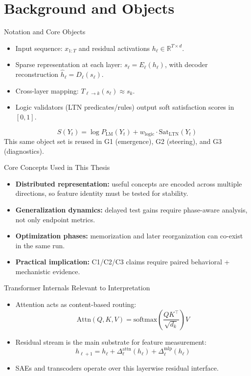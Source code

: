 \section{Background and Objects}

\begin{frame}{Notation and Core Objects}
    \small
    \begin{itemize}
        \item Input sequence: $x_{1:T}$ and residual activations $h_{\ell}\in\mathbb{R}^{T\times d}$.
        \item Sparse representation at each layer: $s_{\ell}=E_{\ell}(h_{\ell})$, with decoder reconstruction $\hat{h}_{\ell}=D_{\ell}(s_{\ell})$.
        \item Cross-layer mapping: $T_{\ell\to k}(s_{\ell})\approx s_k$.
        \item Logic validators (LTN predicates/rules) output soft satisfaction scores in $[0,1]$.
    \end{itemize}
    \vspace{0.4em}
    \[
        S(Y_t)=\log P_{\mathrm{LM}}(Y_t)+w_{\mathrm{logic}}\cdot \mathrm{Sat}_{\mathrm{LTN}}(Y_t)
    \]
    \footnotesize
    This same object set is reused in G1 (emergence), G2 (steering), and G3 (diagnostics).
\end{frame}

\begin{frame}{Core Concepts Used in This Thesis}
    \small
    \begin{itemize}
        \item \textbf{Distributed representation:} useful concepts are encoded across multiple directions, so feature identity must be tested for stability.
        \item \textbf{Generalization dynamics:} delayed test gains require phase-aware analysis, not only endpoint metrics.
        \item \textbf{Optimization phases:} memorization and later reorganization can co-exist in the same run.
        \item \textbf{Practical implication:} C1/C2/C3 claims require paired behavioral + mechanistic evidence.
    \end{itemize}
\end{frame}

\begin{frame}{Transformer Internals Relevant to Interpretation}
    \small
    \begin{itemize}
        \item Attention acts as content-based routing:
        \[
            \mathrm{Attn}(Q,K,V)=\mathrm{softmax}\!\left(\frac{QK^\top}{\sqrt{d_k}}\right)V
        \]
        \item Residual stream is the main substrate for feature measurement:
        \[
            h_{\ell+1}=h_{\ell}+\Delta^{\text{attn}}_{\ell}(h_{\ell})+\Delta^{\text{mlp}}_{\ell}(h_{\ell})
        \]
        \item SAEs and transcoders operate over this layerwise residual interface.
    \end{itemize}
\end{frame}

